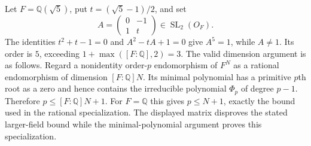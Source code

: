 Let $F=\mathbb Q(\sqrt5)$, put $t=(\sqrt5-1)/2$, and set
\[
                 A=\begin{pmatrix}0&-1\\1&t\end{pmatrix}
                    \in\operatorname{SL}_2(O_F).
\]
The identities $t^2+t-1=0$ and $A^2-tA+1=0$ give
$A^5=1$, while $A\ne1$. Its order is $5$, exceeding
$1+\max([F:\mathbb Q],2)=3$.
The valid dimension argument is as follows. Regard a
nonidentity order-$p$ endomorphism of $F^N$ as a rational
endomorphism of dimension $[F:\mathbb Q]N$. Its minimal
polynomial has a primitive $p$th root as a zero and hence
contains the irreducible polynomial $\Phi_p$ of degree
$p-1$. Therefore $p\leq[F:\mathbb Q]N+1$. For
$F=\mathbb Q$ this gives $p\leq N+1$, exactly the bound
used in the rational specialization. The displayed
matrix disproves the stated larger-field bound while
the minimal-polynomial argument proves this specialization.

